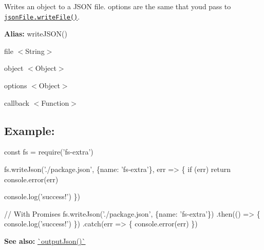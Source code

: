 Writes an object to a J\+S\+ON file. {\ttfamily options} are the same that you\textquotesingle{}d pass to \href{https://github.com/jprichardson/node-jsonfile#writefilefilename-options-callback}{\tt {\ttfamily json\+File.\+write\+File()}}.

{\bfseries Alias\+:} {\ttfamily write\+J\+S\+O\+N()}


\begin{DoxyItemize}
\item {\ttfamily file} {\ttfamily $<$String$>$}
\item {\ttfamily object} {\ttfamily $<$Object$>$}
\item {\ttfamily options} {\ttfamily $<$Object$>$}
\item {\ttfamily callback} {\ttfamily $<$Function$>$}
\end{DoxyItemize}

\subsection*{Example\+:}


\begin{DoxyCode}
const fs = require('fs-extra')

fs.writeJson('./package.json', \{name: 'fs-extra'\}, err => \{
  if (err) return console.error(err)

  console.log('success!')
\})

// With Promises
fs.writeJson('./package.json', \{name: 'fs-extra'\})
.then(() => \{
  console.log('success!')
\})
.catch(err => \{
  console.error(err)
\})
\end{DoxyCode}
 



{\bfseries See also\+:} \mbox{\hyperlink{output_json_8md}{\`{}output\+Json()\`{}}} 